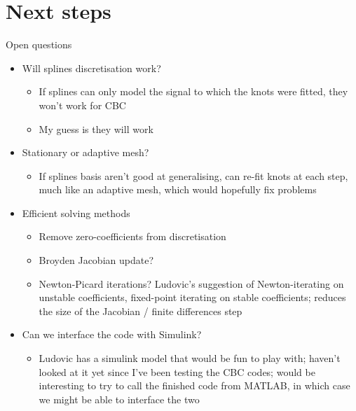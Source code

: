 \documentclass[presentation]{beamer}
\begin{document}
\section{Next steps}
\label{sec:orgd47e73c}
\begin{frame}[plain,label={sec:org562ebbc}]{Open questions}
\begin{itemize}
\item Will splines discretisation work?
\begin{itemize}
\item If splines can only model the signal to which the knots were fitted, they won't work for CBC
\item My guess is they will work
\end{itemize}

\item Stationary or adaptive mesh?
\begin{itemize}
\item If splines basis aren't good at generalising, can re-fit knots at each step, much like an adaptive mesh, which would hopefully fix problems
\end{itemize}

\item Efficient solving methods
\begin{itemize}
\item Remove zero-coefficients from discretisation
\item Broyden Jacobian update?
\item Newton-Picard iterations? Ludovic's suggestion of Newton-iterating on unstable coefficients, fixed-point iterating on stable coefficients; reduces the size of the Jacobian / finite differences step
\end{itemize}

\item Can we interface the code with Simulink?
\begin{itemize}
\item Ludovic has a simulink model that would be fun to play with; haven't looked at it yet since I've been testing the CBC codes; would be interesting to try to call the finished code from MATLAB, in which case we might be able to interface the two
\end{itemize}
\end{itemize}
\end{frame}
\end{document}
